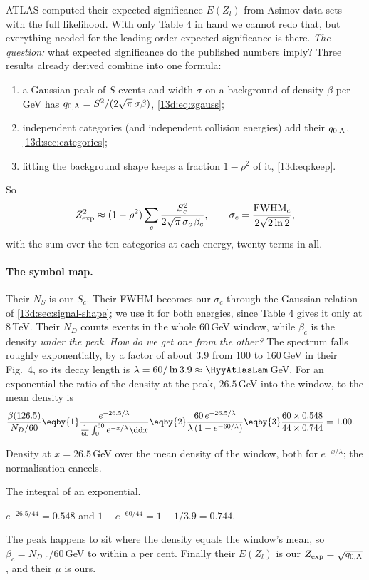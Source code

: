 ATLAS computed their expected significance $E(Z_l)$ from Asimov data sets with the full
likelihood. With only Table 4 in hand we cannot redo that, but everything needed for the
leading-order expected significance is there. \emph{The question:} what expected
significance do the published numbers imply? Three results already derived combine into
one formula:
\begin{enumerate}[label=\arabic*.]
  \item a Gaussian peak of $S$ events and width $\sigma$ on a background of density
        $\beta$ per GeV has $q_{0,\rm A}=S^2/(2\sqrt\pi\,\sigma\beta)$,
        \eqref{13d:eq:zgauss};
  \item independent categories (and independent collision energies) add their
        $q_{0,\rm A}$, \cref{13d:sec:categories};
  \item fitting the background shape keeps a fraction $1-\rho^2$ of it,
        \eqref{13d:eq:keep}.
\end{enumerate}
So
\begin{equation}
  Z_{\rm exp}^2\approx(1-\rho^2)\sum_{c}\frac{S_c^2}{2\sqrt\pi\,\sigma_c\,\beta_c},
  \qquad
  \sigma_c=\frac{\mathrm{FWHM}_c}{2\sqrt{2\ln2}},
  \label{13d:eq:repro}
\end{equation}
with the sum over the ten categories at each energy, twenty terms in all.

\paragraph{The symbol map.}
Their $N_S$ is our $S_c$. Their FWHM becomes our $\sigma_c$ through the Gaussian relation of
\cref{13d:sec:signal-shape}; we use it for both energies, since Table 4 gives it only at
$8\,$TeV. Their $N_D$ counts events in the whole $60\,$GeV window, while $\beta_c$ is the
density \emph{under the peak}. \emph{How do we get one from the other?} The spectrum falls
roughly exponentially, by a factor of about $3.9$ from $100$ to $160\,$GeV in their
Fig.~4, so its decay length is $\lambda=60/\ln3.9\approx\HyyAtlasLam\,$GeV. For an
exponential the ratio of the density at the peak, $26.5\,$GeV into the window, to the
mean density is
\begin{align}
  \frac{\beta(126.5)}{N_D/60}
  &\eqby{1} \frac{e^{-26.5/\lambda}}{\frac{1}{60}\int_0^{60}e^{-x/\lambda}\dd x}
   \eqby{2} \frac{60\,e^{-26.5/\lambda}}{\lambda\,(1-e^{-60/\lambda})}
   \eqby{3} \frac{60\times0.548}{44\times0.744}=1.00 .
  \label{13d:eq:beta-atlas}
\end{align}
\begin{explain}
  \item Density at $x=26.5\,$GeV over the mean density of the window, both for
        $e^{-x/\lambda}$; the normalisation cancels.
  \item The integral of an exponential.
  \item $e^{-26.5/44}=0.548$ and $1-e^{-60/44}=1-1/3.9=0.744$.
\end{explain}
The peak happens to sit where the density equals the window's mean, so
$\beta_c=N_{D,c}/60\,$GeV to within a per cent. Finally their $E(Z_l)$ is our
$Z_{\rm exp}=\sqrt{q_{0,\rm A}}$, and their $\mu$ is ours.

